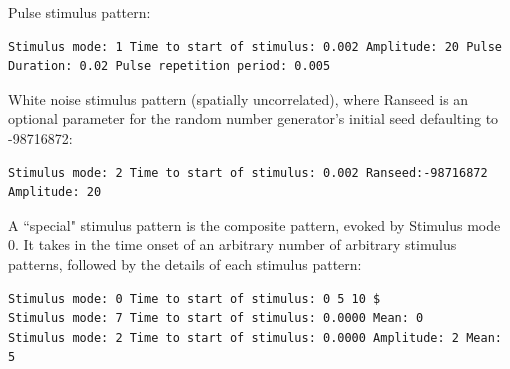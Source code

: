 \documentclass[12pt,a4paper]{article}
\begin{document}
\begin{description}
\begin{itemize}
	Pulse stimulus pattern:
	\begin{lstlisting}
Stimulus mode: 1 Time to start of stimulus: 0.002 Amplitude: 20 Pulse Duration: 0.02 Pulse repetition period: 0.005
	\end{lstlisting}

	White noise stimulus pattern (spatially uncorrelated), where Ranseed
is an optional parameter for the random number generator's initial seed defaulting to -98716872:
	\begin{lstlisting}
Stimulus mode: 2 Time to start of stimulus: 0.002 Ranseed:-98716872 Amplitude: 20
	\end{lstlisting}

	A ``special" stimulus pattern is the composite pattern, evoked by Stimulus mode 0. It takes in the time onset of an arbitrary number of arbitrary stimulus patterns, followed by the details of each stimulus pattern:
	\begin{lstlisting}
Stimulus mode: 0 Time to start of stimulus: 0 5 10 $
Stimulus mode: 7 Time to start of stimulus: 0.0000 Mean: 0
Stimulus mode: 2 Time to start of stimulus: 0.0000 Amplitude: 2 Mean: 5
	\end{lstlisting}

	\end{itemize}
\end{description}
\end{document}
